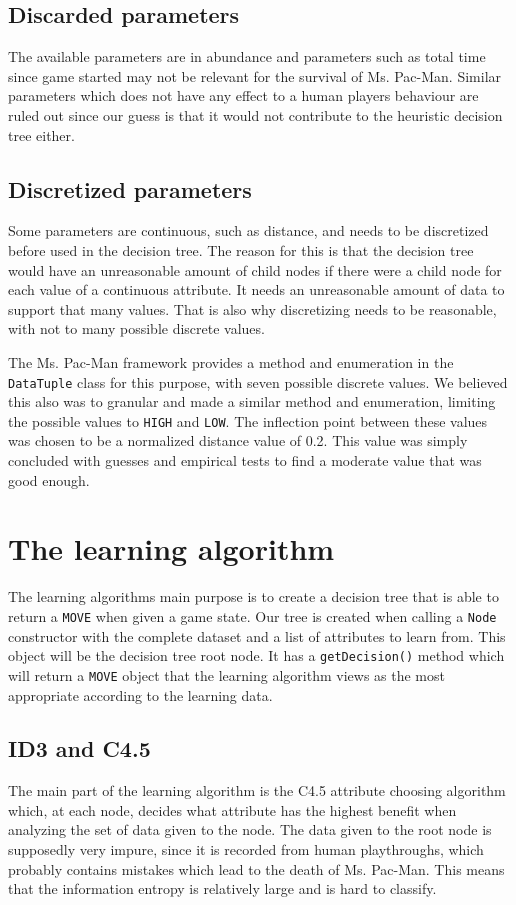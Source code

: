 \documentclass{article}
\begin{document}
    \subsection{Discarded parameters}
    The available parameters are in abundance and parameters such as total time since game started may not be relevant for the survival of Ms. Pac-Man. Similar parameters which does not have any effect to a human players behaviour are ruled out since our guess is that it would not contribute to the heuristic decision tree either.

    \subsection{Discretized parameters}
    Some parameters are continuous, such as distance, and needs to be discretized before used in the decision tree. The reason for this is that the decision tree would have an unreasonable amount of child nodes if there were a child node for each value of a continuous attribute. It needs an unreasonable amount of data to support that many values. That is also why discretizing needs to be reasonable, with not to many possible discrete values.

    The Ms. Pac-Man framework provides a method and enumeration in the \verb|DataTuple| class for this purpose, with seven possible discrete values. We believed this also was to granular and made a similar method and enumeration, limiting the possible values to \verb|HIGH| and \verb|LOW|. The inflection point between these values was chosen to be a normalized distance value of 0.2. This value was simply concluded with guesses and empirical tests to find a moderate value that was good enough.

\section{The learning algorithm}
The learning algorithms main purpose is to create a decision tree that is able to return a \verb|MOVE| when given a game state. Our tree is created when calling a \verb|Node| constructor with the complete dataset and a list of attributes to learn from. This object will be the decision tree root node. It has a \verb|getDecision()| method which will return a \verb|MOVE| object that the learning algorithm views as the most appropriate according to the learning data.

    \subsection{ID3 and C4.5}
    The main part of the learning algorithm is the C4.5 attribute choosing algorithm which, at each node, decides what attribute has the highest benefit when analyzing the set of data given to the node. The data given to the root node is supposedly very impure, since it is recorded from human playthroughs, which probably contains mistakes which lead to the death of Ms. Pac-Man. This means that the information entropy is relatively large and is hard to classify.
\end{document}
